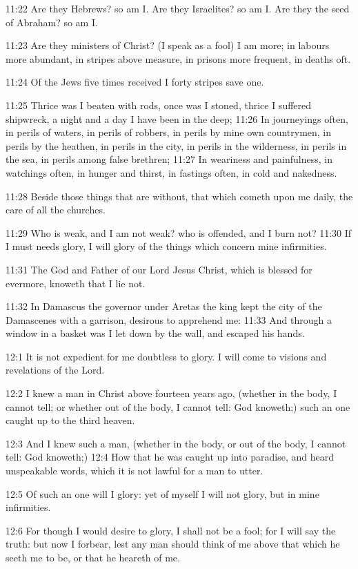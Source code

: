 11:22 Are they Hebrews? so am I. Are they Israelites? so am I. Are
they the seed of Abraham? so am I.

11:23 Are they ministers of Christ? (I speak as a fool) I am more; in
labours more abundant, in stripes above measure, in prisons more
frequent, in deaths oft.

11:24 Of the Jews five times received I forty stripes save one.

11:25 Thrice was I beaten with rods, once was I stoned, thrice I
suffered shipwreck, a night and a day I have been in the deep; 11:26
In journeyings often, in perils of waters, in perils of robbers, in
perils by mine own countrymen, in perils by the heathen, in perils in
the city, in perils in the wilderness, in perils in the sea, in perils
among false brethren; 11:27 In weariness and painfulness, in watchings
often, in hunger and thirst, in fastings often, in cold and nakedness.

11:28 Beside those things that are without, that which cometh upon me
daily, the care of all the churches.

11:29 Who is weak, and I am not weak? who is offended, and I burn not?
11:30 If I must needs glory, I will glory of the things which concern
mine infirmities.

11:31 The God and Father of our Lord Jesus Christ, which is blessed
for evermore, knoweth that I lie not.

11:32 In Damascus the governor under Aretas the king kept the city of
the Damascenes with a garrison, desirous to apprehend me: 11:33 And
through a window in a basket was I let down by the wall, and escaped
his hands.

12:1 It is not expedient for me doubtless to glory. I will come to
visions and revelations of the Lord.

12:2 I knew a man in Christ above fourteen years ago, (whether in the
body, I cannot tell; or whether out of the body, I cannot tell: God
knoweth;) such an one caught up to the third heaven.

12:3 And I knew such a man, (whether in the body, or out of the body,
I cannot tell: God knoweth;) 12:4 How that he was caught up into
paradise, and heard unspeakable words, which it is not lawful for a
man to utter.

12:5 Of such an one will I glory: yet of myself I will not glory, but
in mine infirmities.

12:6 For though I would desire to glory, I shall not be a fool; for I
will say the truth: but now I forbear, lest any man should think of me
above that which he seeth me to be, or that he heareth of me.

